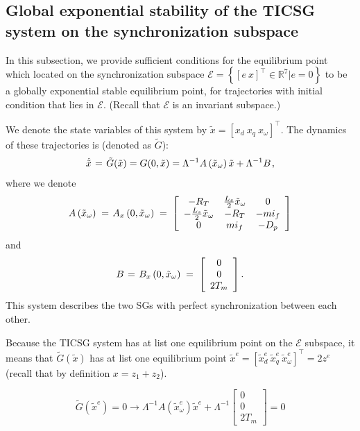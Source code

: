 \documentclass[letterpaper, 10 pt, conference]{ieeeconf}
\renewcommand{\o}    {{\omega}}
\newcommand{\m}      {{\hbox{\hskip 1pt}}}
\begin{document}
\subsection{Global exponential stability of the TICSG system on the
synchronization subspace }

In this subsection, we provide sufficient conditions for the
equilibrium point which located on the synchronization subspace
$\mathscr{E}=\left\{ \left[ e\ x \right]^\top\in\mathbb{R}^{7}|e=0
\right\}$ to be a globally exponential stable equilibrium point, for
trajectories with initial condition that lies in $\mathscr{E}$.
(Recall that $\mathscr{E}$ is an invariant subspace.)

We denote the state variables of this system by $\tilde{x}=
\left[x_d\ x_q\ x_\o\right]^\top$. The dynamics of these trajectories
is (denoted as $\tilde{G}$):
$$ \dot{\tilde{x}} \m=\m \tilde{G}(\tilde{x}) = G(0,\tilde{x}) =
   \Lambda^{-1} A\left( \tilde{x}_\omega \right) \tilde{x}+
   \Lambda^{-1} B \m,$$
where we denote
$$ A\left( \tilde{x}_\o \right) \m=\m A_x\left(0, \tilde{x}_\o
   \right) \m=\m \left[\begin{array}{ccc} - R_T & \frac{L_s}{2}
   \tilde{x}_\o & 0\\ -\frac{L_{s}}{2}\tilde{x}_\o & -R_T & -mi_f\\
   0 & mi_{f} & -D_{p} \end{array}\right]$$
and
$$ B \m=\m B_x\left(0, \tilde{x}_\o \right) \m=\m \left[\begin{array}
   {c} 0\\ 0\\ 2T_m \end{array}\right].$$
This system describes the two SGs with perfect synchronization between
each other.

Because the TICSG system has at list one equilibrium point on the
$\mathscr{E}$ subspace, it means that $\tilde{G}(\tilde{x})$ has at
list one equilibrium point $\tilde{x}^{e}=\left[\tilde{x}_{d}^{e}\
\tilde{x}_{q}^{e}\ \tilde{x}_{\omega}^{e} \right]^\top = 2z^e$ (recall
that by definition $x = z_1 + z_2$).

\begin{equation}
\tilde{G}(\tilde{x}^{e})=0\rightarrow\varLambda^{-1}A(\tilde{x}_{\omega}^{e})\tilde{x}^{e}+\varLambda^{-1}\left[\begin{array}{c}
0\\
0\\
2T_{m}
\end{array}\right]=0\label{eq:G_at_equilibrium}
\end{equation}
\end{document}

